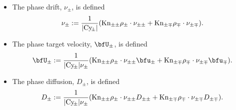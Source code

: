     \begin{itemize}
        \item  The phase drift, $\nu_{\pm}$, is defined
        \begin{equation}
            \nu_{\pm}  :=  \frac{1}{|\mathrm{Cy}\!_{\pm}|}(\mathrm{Kn}_{\pm\pm}\rho_{\pm}\cdot\nu_{\pm\pm} + \mathrm{Kn}_{\pm\mp}\rho_{\mp}\cdot\nu_{\pm\mp}).
        \end{equation}
        \item  The phase target velocity, $\bfU_{\pm}$, is defined
        \begin{equation}
            \bfU_{\pm}  :=  \frac{1}{|\rmCy\!_{\pm}|\nu_{\pm}}(\rmKn_{\pm\pm}\rho_{\pm}\cdot\nu_{\pm\pm}\bfu_{\pm} + \rmKn_{\pm\mp}\rho_{\mp}\cdot\nu_{\pm\mp}\bfu_{\mp}).
        \end{equation}
        \item  The phase diffusion, $D_{\pm}$, is defined
        \begin{equation}
            D_{\pm}  :=  \frac{1}{|\mathrm{Cy}\!_{\pm}|\nu_{\pm}}(\mathrm{Kn}_{\pm\pm}\rho_{\pm}\cdot\nu_{\pm\pm}D_{\pm\pm} + \mathrm{Kn}_{\pm\mp}\rho_{\mp}\cdot\nu_{\pm\mp}D_{\pm\mp}).
        \end{equation}
    \end{itemize}


    
    
